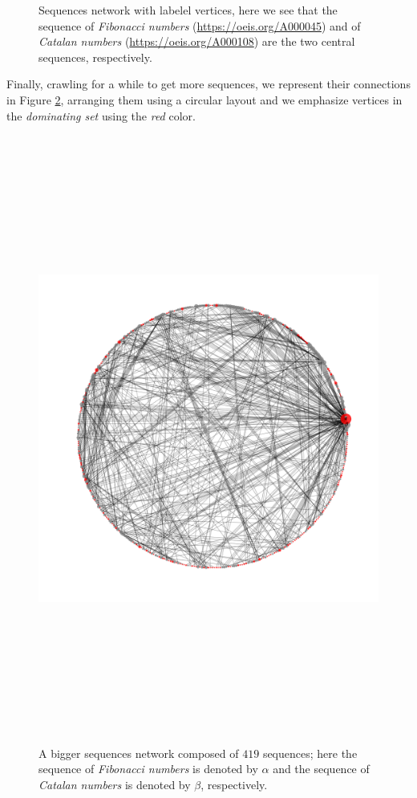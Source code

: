 \begin{figure}
\begin{sideways}
\end{sideways}
\caption{Sequences network with labelel vertices, here we see that the sequence
of \textit{Fibonacci numbers} (\url{https://oeis.org/A000045}) and of
\textit{Catalan numbers} (\url{https://oeis.org/A000108}) are the two central
sequences, respectively.}
\label{fig:oeis:sequences:network:fibonacci:catalan:labeled}
\end{figure}

\begin{example}
Finally, crawling for a while to get more sequences, we represent their
connections in Figure
\ref{fig:oeis:sequences:network:fibonacci:catalan:circular}, arranging them
using a circular layout and we emphasize vertices in the \textit{dominating
set} using the \textit{red} color.
\end{example}

\begin{figure}
\hspace{-2cm}
\includegraphics[width=20cm, height=20cm]{OEIS/circular}
\caption{A bigger sequences network composed of $419$ sequences; here the
sequence of \textit{Fibonacci numbers} is denoted by $\alpha$ and the sequence
of \textit{Catalan numbers} is denoted by $\beta$, respectively.}
\label{fig:oeis:sequences:network:fibonacci:catalan:circular}
\end{figure}


